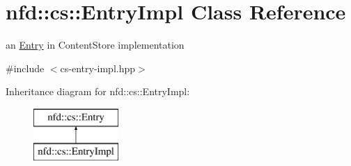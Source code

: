 \hypertarget{classnfd_1_1cs_1_1EntryImpl}{}\section{nfd\+:\+:cs\+:\+:Entry\+Impl Class Reference}
\label{classnfd_1_1cs_1_1EntryImpl}


an \hyperlink{classnfd_1_1cs_1_1Entry}{Entry} in Content\+Store implementation  




{\ttfamily \#include $<$cs-\/entry-\/impl.\+hpp$>$}

Inheritance diagram for nfd\+:\+:cs\+:\+:Entry\+Impl\+:\begin{figure}[H]
\begin{center}
\leavevmode
\includegraphics[height=2.000000cm]{classnfd_1_1cs_1_1EntryImpl}
\end{center}
\end{figure}
